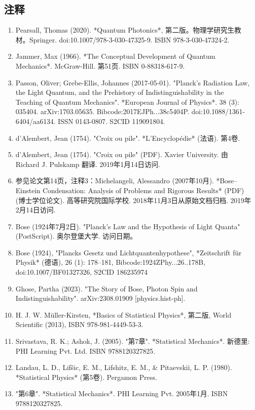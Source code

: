 \subsection{注释}
\begin{enumerate}
\item Pearsall, Thomas (2020). *Quantum Photonics*, 第二版。物理学研究生教材。Springer. doi:10.1007/978-3-030-47325-9. ISBN 978-3-030-47324-2.
\item Jammer, Max (1966). *The Conceptual Development of Quantum Mechanics*. McGraw-Hill. 第51页. ISBN 0-88318-617-9.
\item Passon, Oliver; Grebe-Ellis, Johannes (2017-05-01). "Planck's Radiation Law, the Light Quantum, and the Prehistory of Indistinguishability in the Teaching of Quantum Mechanics". *European Journal of Physics*. 38 (3): 035404. arXiv:1703.05635. Bibcode:2017EJPh...38c5404P. doi:10.1088/1361-6404/aa6134. ISSN 0143-0807. S2CID 119091804.
\item d'Alembert, Jean (1754). "Croix ou pile". *L'Encyclopédie* (法语). 第4卷.
\item d'Alembert, Jean (1754). "Croix ou pile" (PDF). Xavier University. 由 Richard J. Pulskamp 翻译. 2019年1月14日访问.
\item 参见论文第14页，注释3：Michelangeli, Alessandro (2007年10月). *Bose–Einstein Condensation: Analysis of Problems and Rigorous Results* (PDF) (博士学位论文). 高等研究院国际学校. 2018年11月3日从原始文档归档. 2019年2月14日访问.
\item Bose (1924年7月2日). "Planck's Law and the Hypothesis of Light Quanta" (PostScript). 奥尔登堡大学. 访问日期。
\item Bose (1924), "Plancks Gesetz und Lichtquantenhypothese", *Zeitschrift für Physik* (德语), 26 (1): 178–181, Bibcode:1924ZPhy...26..178B, doi:10.1007/BF01327326, S2CID 186235974
\item Ghose, Partha (2023). "The Story of Bose, Photon Spin and Indistinguishability". arXiv:2308.01909 [physics.hist-ph].
\item H. J. W. Müller-Kirsten, *Basics of Statistical Physics*, 第二版, World Scientific (2013), ISBN 978-981-4449-53-3.
\item Srivastava, R. K.; Ashok, J. (2005). "第7章". *Statistical Mechanics*. 新德里: PHI Learning Pvt. Ltd. ISBN 9788120327825.
\item Landau, L. D., Lifšic, E. M., Lifshitz, E. M., & Pitaevskii, L. P. (1980). *Statistical Physics* (第5卷). Pergamon Press.
\item "第6章". *Statistical Mechanics*. PHI Learning Pvt. 2005年1月. ISBN 9788120327825.

\end{enumerate}
